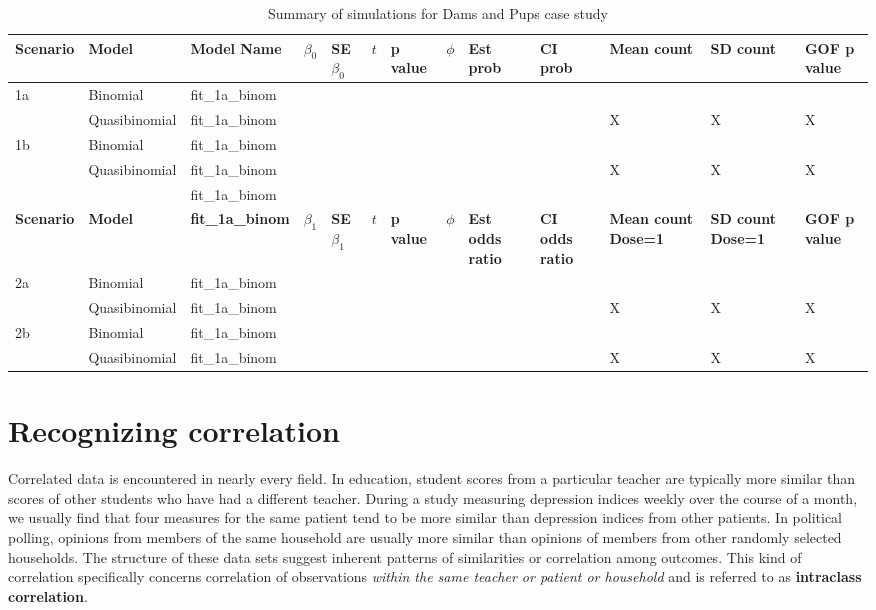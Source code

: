 \documentclass[
]{krantz}
\begin{document}
\begin{table}[t]

\caption{\label{tab:simulationTableCh7}Summary of simulations for Dams and Pups case study}
\centering
\fontsize{12}{14}\selectfont
\begin{tabular}{lllllllllllll}
\toprule
Scenario & Model & Model Name & $\beta_0$ & SE $\beta_0$ & $t$ & p value & $\phi$ & Est prob & CI prob & Mean count & SD count & GOF p value\\
\midrule
1a & Binomial & fit\_1a\_binom &  &  &  &  &  &  &  &  &  & \\
 & Quasibinomial & fit\_1a\_binom &  &  &  &  &  &  &  & X & X & \vphantom{3} X\\
1b & Binomial & fit\_1a\_binom &  &  &  &  &  &  &  &  &  & \\
 & Quasibinomial & fit\_1a\_binom &  &  &  &  &  &  &  & X & X & \vphantom{2} X\\
 &  & fit\_1a\_binom &  &  &  &  &  &  &  &  &  & \\
\addlinespace
\textbf{Scenario} & \textbf{Model} & \textbf{fit\_1a\_binom} & \textbf{$\beta_1$} & \textbf{SE $\beta_1$} & \textbf{$t$} & \textbf{p value} & \textbf{$\phi$} & \textbf{Est odds ratio} & \textbf{CI odds ratio} & \textbf{Mean count Dose=1} & \textbf{SD count Dose=1} & \textbf{GOF p value}\\
2a & Binomial & fit\_1a\_binom &  &  &  &  &  &  &  &  &  & \\
 & Quasibinomial & fit\_1a\_binom &  &  &  &  &  &  &  & X & X & \vphantom{1} X\\
2b & Binomial & fit\_1a\_binom &  &  &  &  &  &  &  &  &  & \\
 & Quasibinomial & fit\_1a\_binom &  &  &  &  &  &  &  & X & X & X\\
\bottomrule
\end{tabular}
\end{table}

\hypertarget{recognizing-correlation}{%
\section{Recognizing correlation}\label{recognizing-correlation}}

Correlated data is encountered in nearly every field. In education, student scores from a particular teacher are typically more similar than scores of other students who have had a different teacher. During a study measuring depression indices weekly over the course of a month, we usually find that four measures for the same patient tend to be more similar than depression indices from other patients. In political polling, opinions from members of the same household are usually more similar than opinions of members from other randomly selected households. The structure of these data sets suggest inherent patterns of similarities or correlation among outcomes. This kind of correlation specifically concerns correlation of observations \emph{within the same teacher or patient or household} and is referred to as \textbf{intraclass correlation}.
\end{document}
